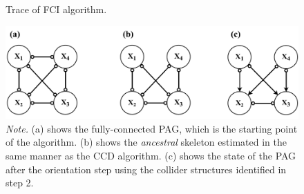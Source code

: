 \documentclass[twoside, 11pt]{article}
\newcommand{\starstar}{%
\begin{tikzpicture}[baseline=-3pt]
    \draw [{Rays[n=6]}-{Rays[n=6]}] (0,0) -- (0.55,0);
\end{tikzpicture}
}
\newcommand{\stararrow}{%
\begin{tikzpicture}
    \draw [{Rays[n=6]}-{Straight Barb[length=2.5pt]}] (0,0) -- (0.5, 0);
\end{tikzpicture}
}
\newcommand{\arrowstar}{%
\begin{tikzpicture}
    \draw [{Straight Barb[length=2.5pt]}-{Rays[n=6]}] (0,0) -- (0.5, 0);
\end{tikzpicture}
}
\newcommand*{\figref}[2][]{%
  \hyperref[{fig:#2}]{%
    Figure~\ref*{fig:#2}%
    \ifx\\#1\\%
    \else
      #1%
    \fi
  }%
}
\begin{document}






\begin{figure}[!t]
    \centering
        \caption{Trace of FCI algorithm.}
        \includegraphics[width=.75\textwidth]{figures/Fig6.pdf}
        \vspace{3mm}
        \caption*{\small{\textit{Note.} (a) shows the fully-connected PAG, which is the starting point of the algorithm. (b) shows the \textit{ancestral} skeleton estimated in the same manner as the CCD algorithm. (c) shows the state of the PAG after the orientation step using the collider structures identified in step 2.}}
    \label{fig:7}
\end{figure}
\end{document}
